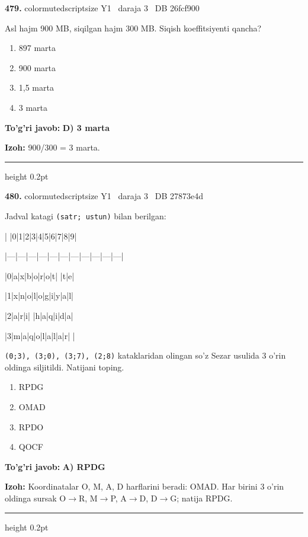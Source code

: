 \documentclass[10pt,a4paper,oneside]{article}
\begin{document}
\noindent\textbf{\color{ink}479.}  {color{muted}scriptsize Y1 \textbullet\ daraja 3 \textbullet\ DB 26fcf900}
\par
Asl hajm 900 MB, siqilgan hajm 300 MB. Siqish koeffitsiyenti qancha?
\begin{enumerate}[label=\Alph*),leftmargin=9mm]
\item 897 marta
\item 900 marta
\item 1,5 marta
\item 3 marta
\end{enumerate}
\begin{tcolorbox}[enhanced,breakable,colback=teal!4,colframe=teal!50!black,boxrule=0.5pt,arc=1.1mm,left=3mm,right=3mm,top=1.7mm,bottom=1.7mm,before skip=2mm,after skip=2mm]
\textbf{\color{teal}To'g'ri javob:} \textbf{D) 3 marta}
\par\smallskip
\textbf{Izoh:} 900/300 = 3 marta.
\end{tcolorbox}
\vspace{2mm}\hrule height 0.2pt \vspace{3mm}

\noindent\textbf{\color{ink}480.}  {color{muted}scriptsize Y1 \textbullet\ daraja 3 \textbullet\ DB 27873e4d}
\par
Jadval katagi \texttt{(satr; ustun)} bilan berilgan:
\medskip\par
| |0|1|2|3|4|5|6|7|8|9|
\par
|---|---|---|---|---|---|---|---|---|---|---|
\par
|0|a|x|b|o|r|o|t| |t|e|
\par
|1|x|n|o|l|o|g|i|y|a|l|
\par
|2|a|r|i| |h|a|q|i|d|a|
\par
|3|m|a|q|o|l|a|l|a|r| |
\medskip\par
\texttt{(0;3), (3;0), (3;7), (2;8)} kataklaridan olingan so'z Sezar usulida 3 o'rin oldinga siljitildi. Natijani toping.
\begin{enumerate}[label=\Alph*),leftmargin=9mm]
\item RPDG
\item OMAD
\item RPDO
\item QOCF
\end{enumerate}
\begin{tcolorbox}[enhanced,breakable,colback=teal!4,colframe=teal!50!black,boxrule=0.5pt,arc=1.1mm,left=3mm,right=3mm,top=1.7mm,bottom=1.7mm,before skip=2mm,after skip=2mm]
\textbf{\color{teal}To'g'ri javob:} \textbf{A) RPDG}
\par\smallskip
\textbf{Izoh:} Koordinatalar O, M, A, D harflarini beradi: OMAD. Har birini 3 o'rin oldinga sursak O\ensuremath{\to}R, M\ensuremath{\to}P, A\ensuremath{\to}D, D\ensuremath{\to}G; natija RPDG.
\end{tcolorbox}
\vspace{2mm}\hrule height 0.2pt \vspace{3mm}
\end{document}
